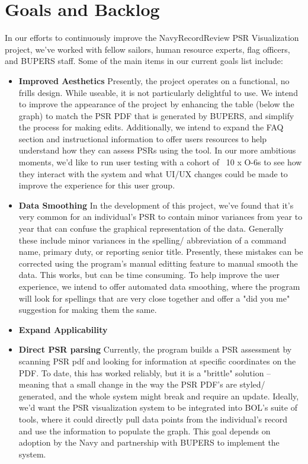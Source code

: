 \documentclass[UTF8]{article}
\begin{document}
\section{Goals and Backlog}
In our efforts to continuously improve the NavyRecordReview PSR Visualization project, we've worked with fellow sailors, human resource experts, flag officers, and BUPERS staff. Some of the main items in our current goals list include:
\begin{itemize}
    \item \textbf{Improved Aesthetics} Presently, the project operates on a functional, no frills design. While useable, it is not particularly delightful to use. We intend to improve the appearance of the project by enhancing the table (below the graph) to match the PSR PDF that is generated by BUPERS, and simplify the process for making edits. Additionally, we intend to expand the FAQ section and instructional information to offer users resources to help understand how they can assess PSRs using the tool. In our more ambitious moments, we'd like to run user testing with a cohort of ~10 x O-6s to see how they interact with the system and what UI/UX changes could be made to improve the experience for this user group.

    \item \textbf{Data Smoothing} In the development of this project, we've found that it's very common for an individual's PSR to contain minor variances from year to year that can confuse the graphical representation of the data. Generally these include minor variances in the spelling/ abbreviation of a command name, primary duty, or reporting senior title. Presently, these mistakes can be corrected using the program's manual editting feature to manual smooth the data. This works, but can be time consuming. To help improve the user experience, we intend to offer automated data smoothing, where the program will look for spellings that are very close together and offer a "did you me" suggestion for making them the same.

    \item \textbf{Expand Applicability} 

    \item \textbf{Direct PSR parsing} Currently, the program builds a PSR assessment by scanning PSR pdf and looking for information at specific coordinates on the PDF. To date, this has worked reliably, but it is a "brittle" solution -- meaning that a small change in the way the PSR PDF's are styled/ generated, and the whole system might break and require an update. Ideally, we'd want the PSR visualization system to be integrated into BOL's suite of tools, where it could directly pull data points from the individual's record and use the information to populate the graph. This goal depends on adoption by the Navy and partnership with BUPERS to implement the system.

\end{itemize}
\end{document}
